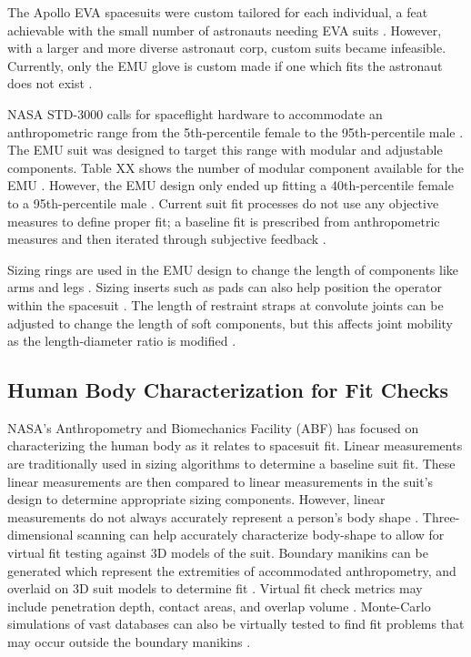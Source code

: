 \documentclass[defaultstyle,11pt]{comps}
\begin{document}
The Apollo EVA spacesuits were custom tailored for each individual, a feat achievable with the small number of astronauts needing EVA suits \citep{Harris2001}.
However, with a larger and more diverse astronaut corp, custom suits became infeasible.
Currently, only the EMU glove is custom made if one which fits the astronaut does not exist \citep{Chappell2017}.

NASA STD-3000 calls for spaceflight hardware to accommodate an anthropometric range from the 5th-percentile female to the 95th-percentile male \citep{NASA1995}.
The EMU suit was designed to target this range with modular and adjustable components.
Table XX shows the number of modular component available for the EMU \citep{King1982}.
However, the EMU design only ended up fitting a 40th-percentile female to a 95th-percentile male \citep{Kim2019}.
Current suit fit processes do not use any objective measures to define proper fit; a baseline fit is prescribed from anthropometric measures and then iterated through subjective feedback \citep{Fineman2017}.

Sizing rings are used in the EMU design to change the length of components like arms and legs \citep{Harris2001}.
Sizing inserts such as pads can also help position the operator within the spacesuit \citep{Chappell2017}.
The length of restraint straps at convolute joints can be adjusted to change the length of soft components, but this affects joint mobility as the length-diameter ratio is modified \citep{Harris2001}.

\hypertarget{human-body-characterization-for-fit-checks}{%
\subsection{Human Body Characterization for Fit Checks}\label{human-body-characterization-for-fit-checks}}

NASA's Anthropometry and Biomechanics Facility (ABF) has focused on characterizing the human body as it relates to spacesuit fit.
Linear measurements are traditionally used in sizing algorithms to determine a baseline suit fit.
These linear measurements are then compared to linear measurements in the suit's design to determine appropriate sizing components.
However, linear measurements do not always accurately represent a person's body shape \citep{Margerum2010}.
Three-dimensional scanning can help accurately characterize body-shape to allow for virtual fit testing against 3D models of the suit.
Boundary manikins can be generated which represent the extremities of accommodated anthropometry, and overlaid on 3D suit models to determine fit \citep{Margerum2010}.
Virtual fit check metrics may include penetration depth, contact areas, and overlap volume \citep{Kim2019}.
Monte-Carlo simulations of vast databases can also be virtually tested to find fit problems that may occur outside the boundary manikins \citep{Kim2019}.
\end{document}
